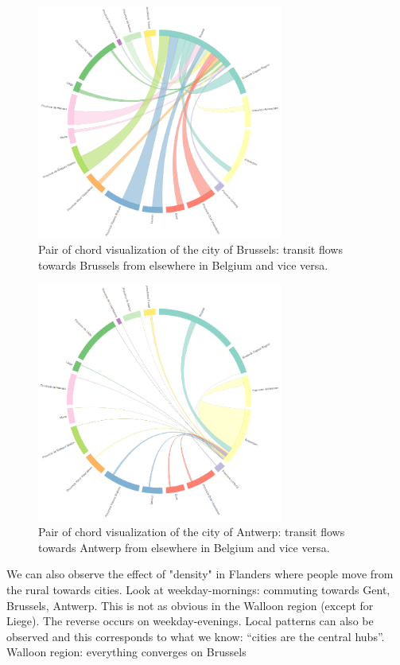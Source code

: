 \documentclass{sig-alternate}
\begin{document}
\begin{figure}
\centering
\includegraphics[width=8.1cm]{brussels}
\caption{Pair of chord visualization of the city of Brussels: transit flows towards Brussels from elsewhere in Belgium and vice versa.}
\label{fig:brussels}
\end{figure}

\begin{figure}
\centering
\includegraphics[width=8.1cm]{antwerp}
\caption{Pair of chord visualization of the city of Antwerp: transit flows towards Antwerp from elsewhere in Belgium and vice versa.}
\label{fig:antwerp}
\end{figure}

We can also observe the effect of "density" in Flanders where people move from the rural towards cities. Look at weekday-mornings: commuting towards Gent, Brussels, Antwerp. This is not as obvious in the Walloon region (except for Liege). The reverse occurs on weekday-evenings. Local patterns can also be observed and this corresponds to what we know: ``cities are the central hubs''.
Walloon region: everything converges on Brussels
\end{document}
